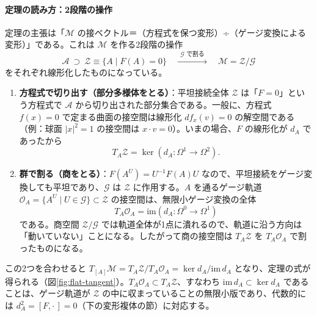 \documentclass[uplatex, dvipdfmx, book]{jsbook}
\begin{document}
\paragraph{定理の読み方：2段階の操作}
定理の主張は「$\mathcal{M}$ の接ベクトル＝（方程式を保つ変形）÷（ゲージ変換による変形）」である。これは $\mathcal{M}$ を作る2段階の操作
\begin{equation*}
    \mathcal{A} \ \supset\ \mathcal{Z} \equiv \{A \mid F(A) = 0\} \quad\xrightarrow{\ \ \text{$\mathcal{G}$ で割る}\ \ }\quad \mathcal{M} = \mathcal{Z}/\mathcal{G}
\end{equation*}
をそれぞれ線形化したものになっている。
\begin{enumerate}
    \item \textbf{方程式で切り出す（部分多様体をとる）}：平坦接続全体 $\mathcal{Z}$ は「$F = 0$」という方程式で $\mathcal{A}$ から切り出された部分集合である。一般に、方程式 $f(x) = 0$ で定まる曲面の接空間は線形化 $df_x(v) = 0$ の解空間である（例：球面 $|x|^2 = 1$ の接空間は $x\cdot v = 0$）。いまの場合、$F$ の線形化が $d_A$ であったから
    \begin{equation*}
        T_A\mathcal{Z} = \ker(d_A : \Omega^1 \to \Omega^2) .
    \end{equation*}
    \item \textbf{群で割る（商をとる）}：$F(A^U) = U^{-1}F(A)U$ なので、平坦接続をゲージ変換しても平坦であり、$\mathcal{G}$ は $\mathcal{Z}$ に作用する。$A$ を通るゲージ軌道 $\mathcal{O}_A = \{A^U \mid U \in \mathcal{G}\} \subset \mathcal{Z}$ の接空間は、無限小ゲージ変換の全体
    \begin{equation*}
        T_A\mathcal{O}_A = \mathrm{im}(d_A : \Omega^0 \to \Omega^1)
    \end{equation*}
    である。商空間 $\mathcal{Z}/\mathcal{G}$ では軌道全体が1点に潰れるので、軌道に沿う方向は「動いていない」ことになる。したがって商の接空間は $T_A\mathcal{Z}$ を $T_A\mathcal{O}_A$ で割ったものになる。
\end{enumerate}
この2つを合わせると $T_{[A]}\mathcal{M} = T_A\mathcal{Z}/T_A\mathcal{O}_A = \ker d_A / \mathrm{im}\, d_A$ となり、定理の式が得られる（図\ref{fig:flat-tangent}）。$T_A\mathcal{O}_A \subset T_A\mathcal{Z}$、すなわち $\mathrm{im}\,d_A \subset \ker d_A$ であることは、ゲージ軌道が $\mathcal{Z}$ の中に収まっていることの無限小版であり、代数的には $d_A^2 = [F, \cdot\,] = 0$（下の変形複体の節）に対応する。
\end{document}
